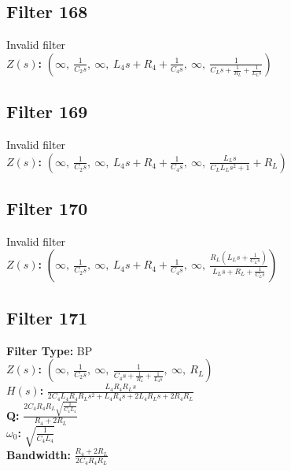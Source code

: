 \documentclass{article}
\begin{document}
\subsection*{Filter 168}
Invalid filter \\ 
\textbf{$Z(s)$:} $\left( \infty, \  \frac{1}{C_{2} s}, \  \infty, \  L_{4} s + R_{4} + \frac{1}{C_{4} s}, \  \infty, \  \frac{1}{C_{L} s + \frac{1}{R_{L}} + \frac{1}{L_{L} s}}\right)$ \\ 
\subsection*{Filter 169}
Invalid filter \\ 
\textbf{$Z(s)$:} $\left( \infty, \  \frac{1}{C_{2} s}, \  \infty, \  L_{4} s + R_{4} + \frac{1}{C_{4} s}, \  \infty, \  \frac{L_{L} s}{C_{L} L_{L} s^{2} + 1} + R_{L}\right)$ \\ 
\subsection*{Filter 170}
Invalid filter \\ 
\textbf{$Z(s)$:} $\left( \infty, \  \frac{1}{C_{2} s}, \  \infty, \  L_{4} s + R_{4} + \frac{1}{C_{4} s}, \  \infty, \  \frac{R_{L} \left(L_{L} s + \frac{1}{C_{L} s}\right)}{L_{L} s + R_{L} + \frac{1}{C_{L} s}}\right)$ \\ 
\subsection*{Filter 171}
\textbf{Filter Type:} BP \\ 
\textbf{$Z(s)$:} $\left( \infty, \  \frac{1}{C_{2} s}, \  \infty, \  \frac{1}{C_{4} s + \frac{1}{R_{4}} + \frac{1}{L_{4} s}}, \  \infty, \  R_{L}\right)$ \\ 
\textbf{$H(s)$:} $\frac{L_{4} R_{4} R_{L} s}{2 C_{4} L_{4} R_{4} R_{L} s^{2} + L_{4} R_{4} s + 2 L_{4} R_{L} s + 2 R_{4} R_{L}}$ \\ 
\textbf{Q:} $\frac{2 C_{4} R_{4} R_{L} \sqrt{\frac{1}{C_{4} L_{4}}}}{R_{4} + 2 R_{L}}$ \\ 
\textbf{$\omega_0$:} $\sqrt{\frac{1}{C_{4} L_{4}}}$ \\ 
\textbf{Bandwidth:} $\frac{R_{4} + 2 R_{L}}{2 C_{4} R_{4} R_{L}}$ \\ 
\end{document}
